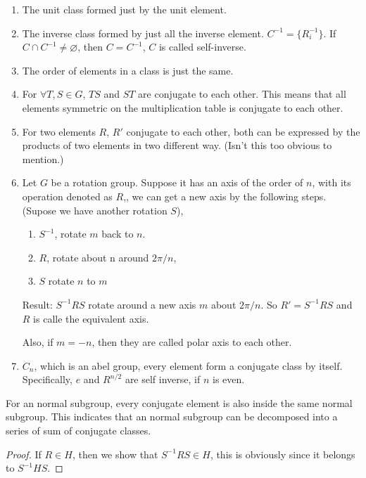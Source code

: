 \begin{fact}$ $

    \begin{enumerate}
        \item The unit class formed just by the unit element.
        \item The inverse class formed by just all the inverse element.
            $C^{-1} = \{ R_i^{-1}\}$. If $C\cap
            C^{-1}\neq\varnothing$, then $C=C^{-1}$, $C$ is called
            self-inverse.
        \item The order of elements in a class is just the same.
        \item For $\forall T,S\in G$, $TS$ and $ST$ are conjugate to each
            other. This means that all elements symmetric on the
            multiplication table is conjugate to each other.
        \item For two elements $R$, $R'$ conjugate to each other, both
            can be expressed by the products of two elements in two
            different way. (Isn't this too obvious to mention.)
        \item Let $G$ be a rotation group. Suppose it has an axis of the
            order of $n$, with its operation denoted as $R$,, we can get
            a new axis by the following steps. (Supose we have another
            rotation $S$),

            \begin{enumerate}
                \item  $S^{-1}$, rotate $m$ back to $n$.
                \item  $R$, rotate about n around $2\pi/n$,
                \item  $S$ rotate $n$ to $m$
            \end{enumerate}

            Result: $S^{-1}RS$ rotate around a new axis $m$ about
            $2\pi/n$. So $R'=S^{-1}RS$ and $R$ is calle the equivalent
            axis. 
            
            Also, if $m=-n$, then they are called polar axis to each
            other.

        \item $C_n$, which is an abel group, every element form a
            conjugate class by itself. Specifically, $e$ and $R^{n/2}$
            are self inverse, if $n$ is even.
    \end{enumerate}
\end{fact}
\begin{prop}
    \label{prop:20161010.conjugate_subgroup}
    For an normal subgroup, every conjugate element is also
    inside the same normal subgroup. This indicates that an normal
    subgroup can be decomposed into a series of sum of conjugate classes.
\end{prop}
\begin{proof}
    If $R\in H$, then we show that $S^{-1}RS\in H$, this is obviously
    since it belongs to $S^{-1}HS$.
\end{proof}

